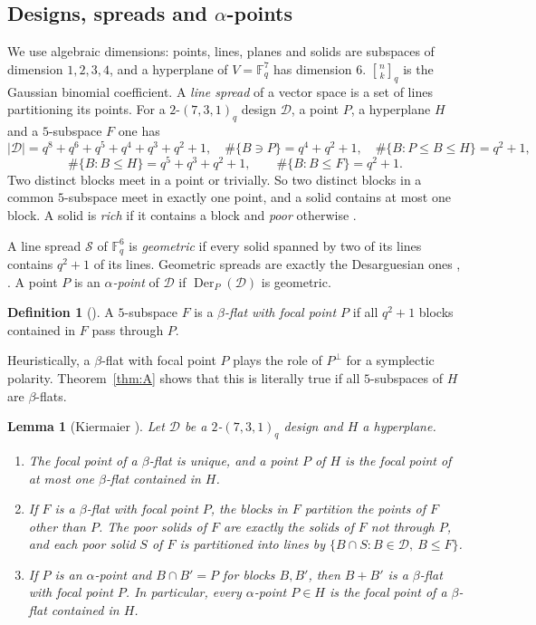 \documentclass[11pt]{amsart}
\newtheorem{lemma}[theorem]{Lemma}
\theoremstyle{definition}
\newtheorem{definition}[theorem]{Definition}
\newcommand{\F}{\mathbb{F}}
\newcommand{\gauss}[3]{\genfrac{[}{]}{0pt}{}{#1}{#2}_{#3}}
\newcommand{\D}{\mathcal{D}}
\newcommand{\Der}{\operatorname{Der}}
\begin{document}
\subsection{\texorpdfstring{Designs, spreads and $\alpha$-points}{Designs, spreads and alpha-points}}
We use algebraic dimensions: points, lines, planes and solids are subspaces of dimension $1,2,3,4$, and a hyperplane of $V=\F_q^7$ has dimension $6$. $\gauss nkq$ is the Gaussian binomial coefficient. A \emph{line spread} of a vector space is a set of lines partitioning its points. For a $2$-$(7,3,1)_q$ design $\D$, a point $P$, a hyperplane $H$ and a $5$-subspace $F$ one has \cite[Sect.~2.2]{Kie22}
\[
|\D|=q^8+q^6+q^5+q^4+q^3+q^2+1,\quad \#\{B\ni P\}=q^4+q^2+1,\quad \#\{B: P\le B\le H\}=q^2+1,
\]
\[
\#\{B: B\le H\}=q^5+q^3+q^2+1,\qquad \#\{B: B\le F\}=q^2+1.
\]
Two distinct blocks meet in a point or trivially. So two distinct blocks in a common $5$-subspace meet in exactly one point, and a solid contains at most one block. A solid is \emph{rich} if it contains a block and \emph{poor} otherwise \cite{Kie22}.

A line spread $\mathcal S$ of $\F_q^6$ is \emph{geometric} if every solid spanned by two of its lines contains $q^2+1$ of its lines. Geometric spreads are exactly the Desarguesian ones \cite{BC74}, \cite[Sect.~2.3]{Kie22}. A point $P$ is an \emph{$\alpha$-point} of $\D$ if $\Der_P(\D)$ is geometric.

\begin{definition}[\cite{Kie22}]
A $5$-subspace $F$ is a \emph{$\beta$-flat with focal point $P$} if all $q^2+1$ blocks contained in $F$ pass through $P$.
\end{definition}

Heuristically, a $\beta$-flat with focal point $P$ plays the role of $P^\perp$ for a symplectic polarity. Theorem~\ref{thm:A} shows that this is literally true if all $5$-subspaces of $H$ are $\beta$-flats.

\begin{lemma}[Kiermaier {\cite[Lemmas~3.2--3.5, 3.8]{Kie22}}]\label{lem:K}
Let $\D$ be a $2$-$(7,3,1)_q$ design and $H$ a hyperplane.
\begin{enumerate}[label=(\alph*)]
\item The focal point of a $\beta$-flat is unique, and a point $P$ of $H$ is the focal point of at most one $\beta$-flat contained in $H$.
\item If $F$ is a $\beta$-flat with focal point $P$, the blocks in $F$ partition the points of $F$ other than $P$. The poor solids of $F$ are exactly the solids of $F$ not through $P$, and each poor solid $S$ of $F$ is partitioned into lines by $\{B\cap S: B\in\D,\ B\le F\}$.
\item If $P$ is an $\alpha$-point and $B\cap B'=P$ for blocks $B,B'$, then $B+B'$ is a $\beta$-flat with focal point $P$. In particular, every $\alpha$-point $P\in H$ is the focal point of a $\beta$-flat contained in $H$.
\end{enumerate}
\end{lemma}
\end{document}
